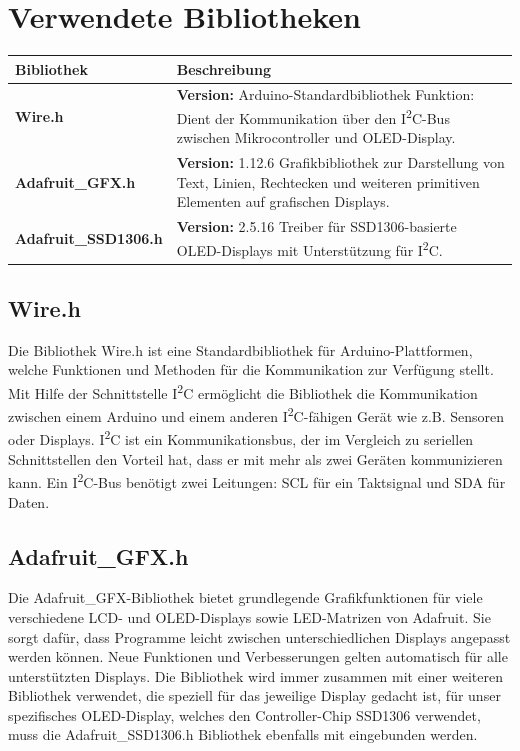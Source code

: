 \section{Verwendete Bibliotheken}
\begin{center}
	\label{tab:oled_libs}
	\begin{tabular}{|p{5cm}|p{9cm}|}
		\hline
		\textbf{Bibliothek} & \textbf{Beschreibung} \\
		\hline
		\textbf{Wire.h} &  \textbf{Version:} Arduino-Standardbibliothek \newline
		Funktion: Dient der Kommunikation über den I\textsuperscript{2}C-Bus zwischen Mikrocontroller und OLED-Display. \\
		\hline
		\textbf{Adafruit\_GFX.h} & \textbf{Version:} 1.12.6 \newline
		Grafikbibliothek zur Darstellung von Text, Linien, Rechtecken und weiteren primitiven Elementen auf grafischen Displays. \\
		\hline
		\textbf{Adafruit\_SSD1306.h} & \textbf{Version:} 2.5.16 \newline
		Treiber für SSD1306-basierte OLED-Displays mit Unterstützung für I\textsuperscript{2}C. \\
		\hline
	\end{tabular}
	\cite{arduinoLibraries:2025}
	\cite{AdafruitGFX:2023}
\end{center}

\subsection{Wire.h}
Die Bibliothek Wire.h ist eine Standardbibliothek für Arduino-Plattformen, welche Funktionen und Methoden für die Kommunikation zur Verfügung stellt. Mit Hilfe der Schnittstelle I\textsuperscript{2}C ermöglicht die Bibliothek die Kommunikation zwischen einem Arduino und einem anderen I\textsuperscript{2}C-fähigen Gerät wie z.B. Sensoren oder Displays. I\textsuperscript{2}C ist ein Kommunikationsbus, der im Vergleich zu seriellen Schnittstellen den Vorteil hat, dass er mit mehr als zwei Geräten kommunizieren kann. Ein I\textsuperscript{2}C-Bus benötigt zwei Leitungen: SCL für ein Taktsignal und SDA für Daten.\cite{arduinoLibraries:2025}

\subsection{Adafruit\_GFX.h}
Die Adafruit\_GFX-Bibliothek bietet grundlegende Grafikfunktionen für viele verschiedene LCD- und OLED-Displays sowie LED-Matrizen von Adafruit. Sie sorgt dafür, dass Programme leicht zwischen unterschiedlichen Displays angepasst werden können. Neue Funktionen und Verbesserungen gelten automatisch für alle unterstützten Displays.
Die Bibliothek wird immer zusammen mit einer weiteren Bibliothek verwendet, die speziell für das jeweilige Display gedacht ist, für unser spezifisches OLED-Display, welches den Controller-Chip SSD1306 verwendet, muss die Adafruit\_SSD1306.h Bibliothek ebenfalls mit eingebunden werden.\cite{AdafruitGFX:2023}

